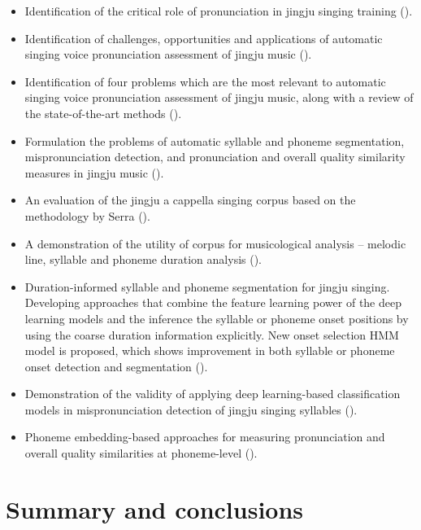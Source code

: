 \begin{itemize}[leftmargin=*]
\item Identification of the critical role of pronunciation in jingju singing training ().
\item Identification of challenges, opportunities and applications of automatic singing voice pronunciation assessment of jingju music ().
\item Identification of four problems which are the most relevant to automatic singing voice pronunciation assessment of jingju music, along with a review of the state-of-the-art methods (). 
\item Formulation the problems of automatic syllable and phoneme segmentation, mispronunciation detection, and pronunciation and overall quality similarity measures in jingju music ().
\item An evaluation of the jingju a cappella singing corpus based on the methodology by Serra \cite{Serra2014} ().
\item A demonstration of the utility of corpus for musicological analysis -- melodic line, syllable and phoneme duration analysis ().
\item Duration-informed syllable and phoneme segmentation for jingju singing. Developing approaches that combine the feature learning power of the deep learning models and the inference the syllable or phoneme onset positions by using the coarse duration information explicitly. New onset selection HMM model is proposed, which shows improvement in both syllable or phoneme onset detection and segmentation ().
\item Demonstration of the validity of applying deep learning-based classification models in mispronunciation detection of jingju singing syllables (). 
\item Phoneme embedding-based approaches for measuring pronunciation and overall quality similarities at phoneme-level ().
\end{itemize}

\section{Summary and conclusions}

